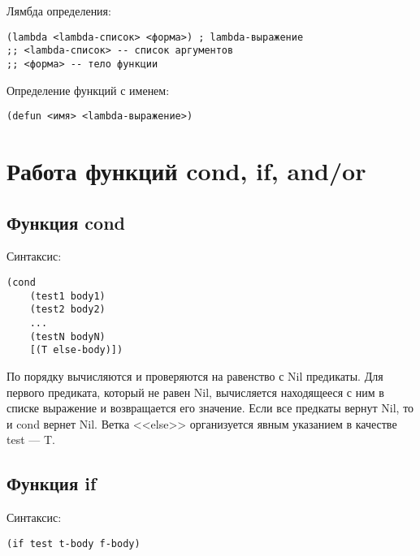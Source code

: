 Лямбда определения:

\vspace{4mm}
\begin{minipage}{0.92\linewidth}
\begin{lstlisting}
(lambda <lambda-список> <форма>) ; lambda-выражение
;; <lambda-список> -- список аргументов
;; <форма> -- тело функции
\end{lstlisting}
\end{minipage}

Определение функций с именем:

\vspace{4mm}
\begin{minipage}{0.92\linewidth}
\begin{lstlisting}
(defun <имя> <lambda-выражение>)
\end{lstlisting}
\end{minipage}

\section{Работа функций cond, if, and/or}

\subsection{Функция cond}

Синтаксис:

\vspace{4mm}
\begin{minipage}{0.92\linewidth}
\begin{lstlisting}
(cond
    (test1 body1)
    (test2 body2)
    ...
    (testN bodyN)
    [(T else-body)])
\end{lstlisting}
\end{minipage}

По порядку вычисляются и проверяются на равенство с Nil предикаты. Для
первого предиката, который не равен Nil, вычисляется находящееся с ним
в списке выражение и возвращается его значение. Если все предкаты вернут
Nil, то и cond вернет Nil. Ветка <<else>> организуется явным указанием в
качестве test --- T.

\subsection{Функция if}

Синтаксис:

\vspace{4mm}
\begin{minipage}{0.92\linewidth}
\begin{lstlisting}
(if test t-body f-body)
\end{lstlisting}
\end{minipage}

